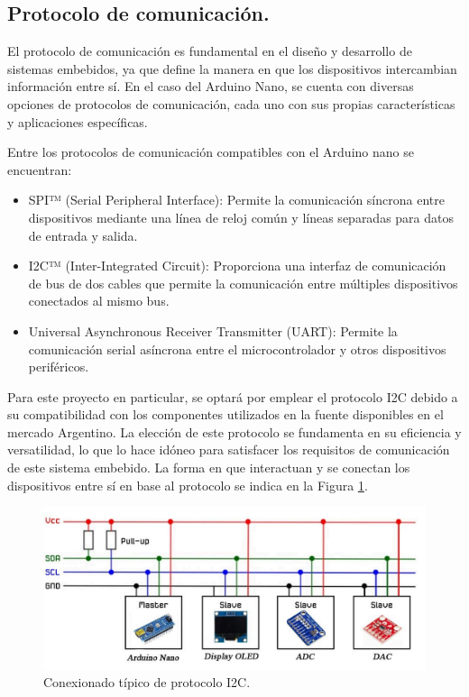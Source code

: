 \subsection{Protocolo de comunicación.}
El protocolo de comunicación es fundamental en el diseño y desarrollo de sistemas embebidos, ya que define la manera en que los dispositivos intercambian información entre sí. En el caso del Arduino Nano, se cuenta con diversas opciones de protocolos de comunicación, cada uno con sus propias características y aplicaciones específicas. \par 
Entre los protocolos de comunicación compatibles con el Arduino nano se encuentran:
\begin{itemize}
    \item SPI™ (Serial Peripheral Interface): Permite la comunicación síncrona entre dispositivos mediante una línea de reloj común y líneas separadas para datos de entrada y salida.
    \item I2C™ (Inter-Integrated Circuit): Proporciona una interfaz de comunicación de bus de dos cables que permite la comunicación entre múltiples dispositivos conectados al mismo bus.
    \item Universal Asynchronous Receiver Transmitter (UART): Permite la comunicación serial asíncrona entre el microcontrolador y otros dispositivos periféricos.
\end{itemize}\par 
Para este proyecto en particular, se optará por emplear el protocolo I2C debido a su compatibilidad con los componentes utilizados en la fuente disponibles en el mercado Argentino. La elección de este protocolo se fundamenta en su eficiencia y versatilidad, lo que lo hace idóneo para satisfacer los requisitos de comunicación de este sistema embebido.
La forma en que interactuan y se conectan los dispositivos entre sí en base al protocolo se indica en la Figura \ref{F:diagrama_protocolo_i2c}.

\begin{figure}[H]
    \centering
    \includegraphics[scale=0.5]{./imagenes/i2cprotocol.jpg}
    \caption{Conexionado típico de protocolo I2C.}
    \label{F:diagrama_protocolo_i2c}
\end{figure}

